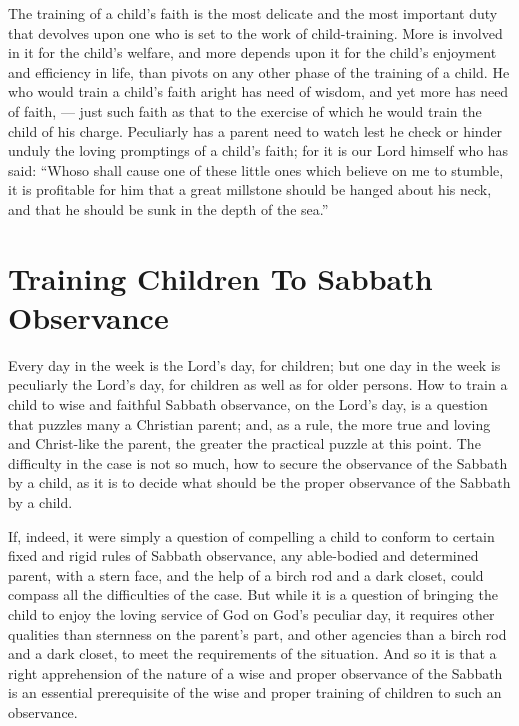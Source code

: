 \documentclass[
]{book}
\begin{document}
The training of a child's faith is the most delicate and the most important duty that devolves upon one who is set to the work of child-training. More is involved in it for the child's welfare, and more depends upon it for the child's enjoyment and efficiency in life, than pivots on any other phase of the training of a child. He who would train a child's faith aright has need of wisdom, and yet more has need of faith, --- just such faith as that to the exercise of which he would train the child of his charge. Peculiarly has a parent need to watch lest he check or hinder unduly the loving promptings of a child's faith; for it is our Lord himself who has said: ``Whoso shall cause one of these little ones which believe on me to stumble, it is profitable for him that a great millstone should be hanged about his neck, and that he should be sunk in the depth of the sea.''

\hypertarget{training-children-to-sabbath-observance}{%
\chapter{Training Children To Sabbath Observance}\label{training-children-to-sabbath-observance}}

Every day in the week is the Lord's day, for children; but one day in the week is peculiarly the Lord's day, for children as well as for older persons. How to train a child to wise and faithful Sabbath observance, on the Lord's day, is a question that puzzles many a Christian parent; and, as a rule, the more true and loving and Christ-like the parent, the greater the practical puzzle at this point. The difficulty in the case is not so much, how to secure the observance of the Sabbath by a child, as it is to decide what should be the proper observance of the Sabbath by a child.

If, indeed, it were simply a question of compelling a child to conform to certain fixed and rigid rules of Sabbath observance, any able-bodied and determined parent, with a stern face, and the help of a birch rod and a dark closet, could compass all the difficulties of the case. But while it is a question of bringing the child to enjoy the loving service of God on God's peculiar day, it requires other qualities than sternness on the parent's part, and other agencies than a birch rod and a dark closet, to meet the requirements of the situation. And so it is that a right apprehension of the nature of a wise and proper observance of the Sabbath is an essential prerequisite of the wise and proper training of children to such an observance.
\end{document}
